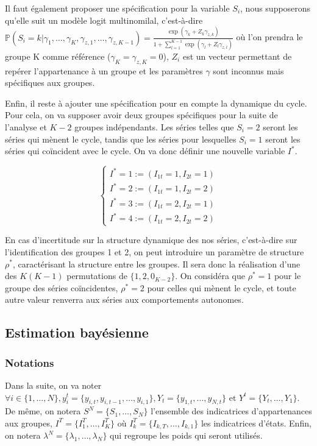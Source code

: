 \documentclass[10pt,french,french]{article}
\begin{document}
Il faut également proposer une spécification pour la variable \(S_i\), nous supposerons qu'elle suit un modèle logit multinomilal, c'est-à-dire \(\mathbb{P}(S_i = k |\gamma_1, \dots, \gamma_K, \gamma_{z,1}, \dots, \gamma_{z,K-1}) = \displaystyle\frac{\exp(\gamma_k + Z_k\gamma_{z,k})}{1 + \sum\limits_{l=1}^{K-1} \exp(\gamma_l + Z_l\gamma_{z,l})}\) où l'on prendra le groupe K comme référence (\(\gamma_K = \gamma_{z,K}=0\)), \(Z_i\) est un vecteur permettant de repérer l'appartenance à un groupe et les paramètres \(\gamma\) sont inconnus mais spécifiques aux groupes.

Enfin, il reste à ajouter une spécification pour en compte la dynamique du cycle. Pour cela, on va supposer avoir deux groupes spécifiques pour la suite de l'analyse et \(K-2\) groupes indépendants. Les séries telles que \(S_i = 2\) seront les séries qui mènent le cycle, tandis que les séries pour lesquelles \(S_i = 1\) seront les séries qui coïncident avec le cycle. On va donc définir une nouvelle variable \(I^*\).

\[\begin{cases}
I^* = 1 := (I_{1t}=1,I_{2t}=1) \\
I^* = 2 := (I_{1t}=1,I_{2t}=2) \\
I^* = 3 := (I_{1t}=2,I_{2t}=1) \\
I^* = 4 := (I_{1t}=2,I_{2t}=2) 
\end{cases}\]

En cas d'incertitude sur la structure dynamique des nos séries, c'est-à-dire sur l'identification des groupes 1 et 2, on peut introduire un paramètre de structure \(\rho^*\), caractérisant la structure entre les groupes. Il sera donc la réalisation d'une des \(K(K-1)\) permutations de \(\{1,2,0_{K-2}\}\). On considéra que \(\rho^*=1\) pour le groupe des séries coïncidentes, \(\rho^*=2\) pour celles qui mènent le cycle, et toute autre valeur renverra aux séries aux comportements autonomes.

\hypertarget{estimation-bayuxe9sienne}{%
\subsection{Estimation bayésienne}\label{estimation-bayuxe9sienne}}

\hypertarget{notations}{%
\subsubsection{Notations}\label{notations}}

Dans la suite, on va noter \(\forall i \in \{1,\dots,N\}, y_i^t = \{y_{i,t},y_{i,t-1},\dots,y_{i,1}\}, Y_t = \{y_{1,t}, \dots, y_{N,t} \} \text{ et } Y^t = \{Y_t, \dots, Y_1\}\). De même, on notera \(S^N = \{S_1, \dots, S_N\}\) l'ensemble des indicatrices d'appartenances aux groupes, \(I^T = \{I_1^T, \dots, I_K^T\}\) où \(I_k^T=\{I_{k,T}, \dots, I_{k,1}\}\) les indicatrices d'états. Enfin, on notera \(\lambda^N = \{\lambda_1, \dots, \lambda_N\}\) qui regroupe les poids qui seront utilisés.
\end{document}
